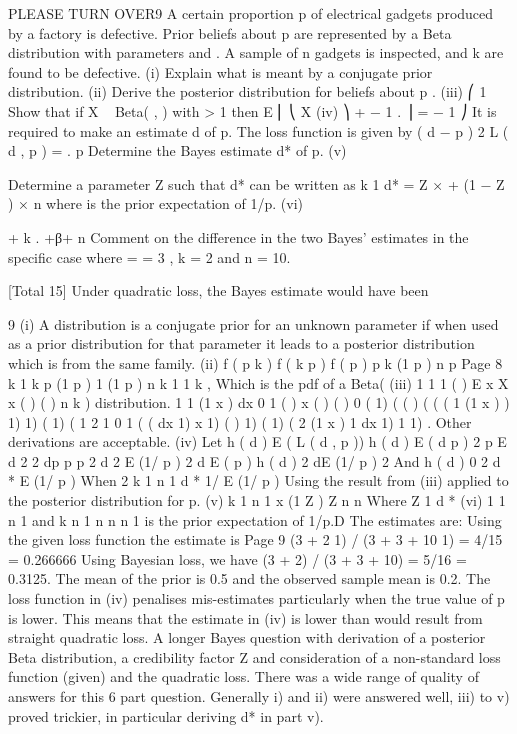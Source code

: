 \documentclass[a4paper,12pt]{article}
\begin{document}
PLEASE TURN OVER9
A certain proportion p of electrical gadgets produced by a factory is defective. Prior
beliefs about p are represented by a Beta distribution with parameters \alpha and \beta . A
sample of n gadgets is inspected, and k are found to be defective.
(i) Explain what is meant by a conjugate prior distribution. 
(ii) Derive the posterior distribution for beliefs about p . 
(iii) ⎛ 1
Show that if X ~ Beta( \alpha , \beta ) with \alpha > 1 then E ⎜
⎝ X
(iv)
⎞ \alpha + \beta − 1
.
⎟ =
\alpha − 1
⎠
It is required to make an estimate d of p. The loss function is given by
( d − p ) 2
L ( d , p ) =
.
p
Determine the Bayes estimate d* of p.
(v)


Determine a parameter Z such that d* can be written as
k
1
d* = Z × + (1 − Z ) ×
n
\mu 
where \mu is the prior expectation of 1/p.
(vi)

\alpha+ k
.
\alpha +β+ n
Comment on the difference in the two Bayes’ estimates in the specific case
where \alpha = \beta = 3 , k = 2 and n = 10.

[Total 15]
Under quadratic loss, the Bayes estimate would have been

9
(i) A distribution is a conjugate prior for an unknown parameter if when used
as a prior distribution for that parameter it leads to a posterior distribution
which is from the same family.
(ii) f ( p k ) f ( k p ) f ( p )
p k (1 p ) n
p
Page 8
k 1
k
p
(1 p )
1
(1 p )
n k 1
1%
k ,
Which is the pdf of a Beta(
(iii)
1
1
1 (
)
E
x
X
x ( ) ( )
n k ) distribution.
1
1
(1 x )
dx
0
1
(
)
x
( ) ( )
0
( 1) (
( ) (
(
(
1
(1 x )
)
1)
1) (
1) (
1
2
1
0
1
(
(
dx
1)
x
1) ( )
1) (
1) (
2
(1 x )
1
dx
1)
1
1)
.
Other derivations are acceptable.
(iv) Let
h ( d ) E ( L ( d , p ))
h ( d )
E
( d
p ) 2
p
E
d 2
2 dp
p
p 2
d 2 E (1/ p ) 2 d
E ( p )
h ( d ) 2 dE (1/ p ) 2
And
h ( d ) 0
2 d * E (1/ p )
When
2
k 1
n 1
d * 1/ E (1/ p )
Using the result from (iii) applied to the posterior distribution for p.
(v)
k 1
n 1
x
(1 Z ) Z
n
n
Where Z
1
d *
(vi)
1
1
n 1
and
k
n 1 n
n
n 1
is the prior expectation of 1/p.D
The estimates are:
Using the given loss function the estimate is
Page 9%
(3 + 2
1) / (3 + 3 + 10
1) = 4/15 = 0.266666
Using Bayesian loss, we have (3 + 2) / (3 + 3 + 10) = 5/16 = 0.3125.
The mean of the prior is 0.5 and the observed sample mean is 0.2. The loss
function in (iv) penalises mis-estimates particularly when the true value of p is
lower. This means that the estimate in (iv) is lower than would result from
straight quadratic loss.
A longer Bayes question with derivation of a posterior Beta distribution, a
credibility factor Z and consideration of a non-standard loss function (given) and
the quadratic loss. There was a wide range of quality of answers for this 6 part
question. Generally i) and ii) were answered well, iii) to v) proved trickier, in
particular deriving d* in part v).
\end{document}
